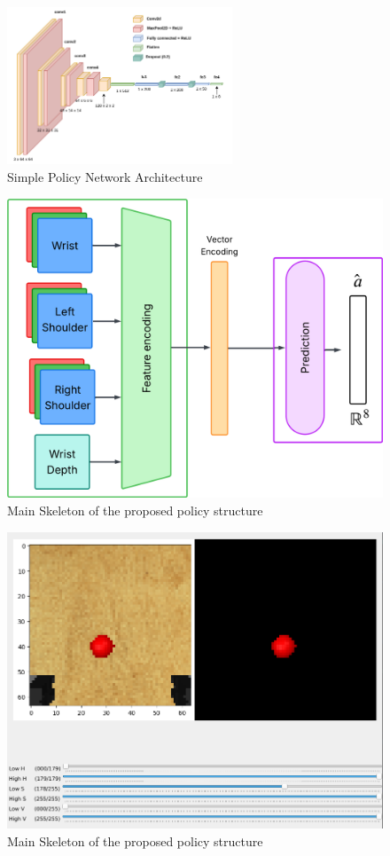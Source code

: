 \begin{figure}[h]
  \centering
  \includegraphics[width=0.6\textwidth]{assets/early-work/cnn-encoder-policy-head.png}
  \caption{Simple Policy Network Architecture}\label{fig:policy-arch}
\end{figure}

\begin{figure}[htpb]
  \centering
  \includegraphics[width=0.7\linewidth]{assets/cam-comb/policies/general-diagram.png}
  \caption{Main Skeleton of the proposed policy structure}\label{fig:policies-skeleton-idea}
\end{figure}

\begin{figure}[htpb]
  \centering
  \includegraphics[width=0.7\linewidth]{assets/appl/tuning-colour-segmenter.png}
  \caption{Main Skeleton of the proposed policy structure}\label{fig:appl-first-hsv}
\end{figure}

